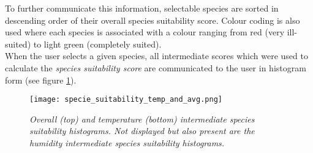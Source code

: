 To further communicate this information, selectable species are sorted in descending order of their overall species suitability score. Colour coding is also used where each species is associated with a colour ranging from red (very ill-suited) to light green (completely suited).\\

When the user selects a given species, all intermediate scores which were used to calculate the \textit{species suitability score} are communicated to the user in histogram form (see figure \ref{fig:specie_intermediate_suitability_scores}).

\begin{figure}
\center
	\texttt{[image: specie\_suitability\_temp\_and\_avg.png]}
	\caption{ \textit{Overall (top) and temperature (bottom) intermediate species suitability histograms. Not displayed but also present are the humidity intermediate species suitability histograms.}}	
	\label{fig:specie_intermediate_suitability_scores}
\end{figure}


